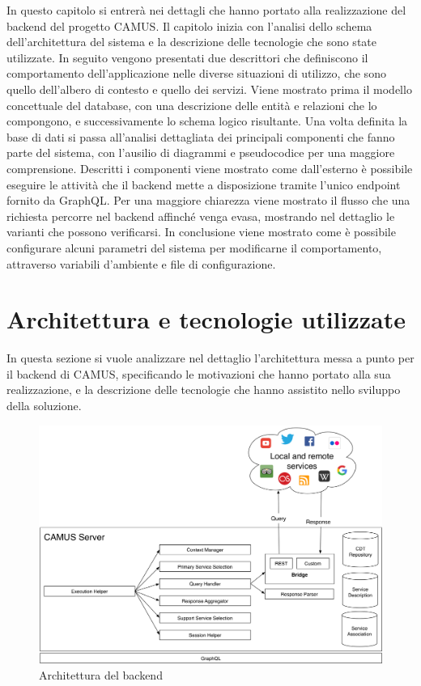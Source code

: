 In questo capitolo si entrerà nei dettagli che hanno portato alla realizzazione del backend del progetto CAMUS. Il capitolo inizia con l'analisi dello schema dell'architettura del sistema e la descrizione delle tecnologie che sono state utilizzate. In seguito vengono presentati due descrittori che definiscono il comportamento dell'applicazione nelle diverse situazioni di utilizzo, che sono quello dell'albero di contesto e quello dei servizi. Viene mostrato prima il modello concettuale del database, con una descrizione delle entità e relazioni che lo compongono, e successivamente lo schema logico risultante. Una volta definita la base di dati si passa all'analisi dettagliata dei principali componenti che fanno parte del sistema, con l'ausilio di diagrammi e pseudocodice per una maggiore comprensione. Descritti i componenti viene mostrato come dall'esterno è possibile eseguire le attività che il backend mette a disposizione tramite l'unico endpoint fornito da GraphQL. Per una maggiore chiarezza viene mostrato il flusso che una richiesta percorre nel backend affinché venga evasa, mostrando nel dettaglio le varianti che possono verificarsi. In conclusione viene mostrato come è possibile configurare alcuni parametri del sistema per modificarne il comportamento, attraverso variabili d'ambiente e file di configurazione.

\section{Architettura e tecnologie utilizzate\label{sec:architettura-backend}}

In questa sezione si vuole analizzare nel dettaglio l'architettura messa a punto per il backend di CAMUS, specificando le motivazioni che hanno portato alla sua realizzazione, e la descrizione delle tecnologie che hanno assistito nello sviluppo della soluzione.

\begin{figure}[ht]
	\centering
	\includegraphics[width=\textwidth]{5-implementazione-backend/Immagini/camus-architecture.png}
	\caption{Architettura del backend}\label{fig:architettura-backend}
\end{figure}

